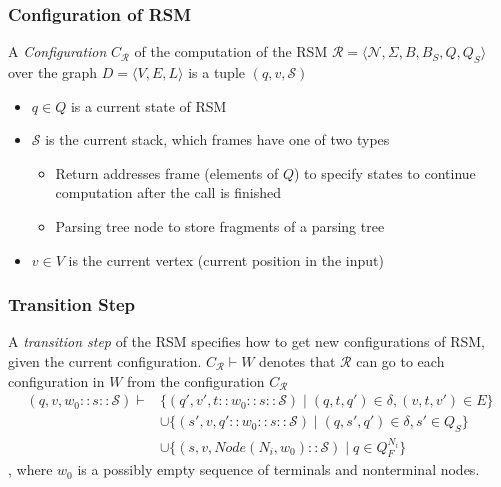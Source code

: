 \documentclass[xcolor=table,aspectratio=169]{beamer}
\begin{document}
\begin{frame}[fragile]
  \frametitle{Configuration of RSM}  
  \begin{definition}
    A \textit{Configuration} $C_{\mathcal{R}}$ of the computation of the RSM $\mathcal{R}=\langle \mathcal{N},\Sigma,B,B_S,Q,Q_S \rangle$ over the graph $D=\langle V,E,L \rangle$ is a tuple $(q,v,\mathcal{S})$
    \begin{itemize}
        \item $q \in Q$ is a current state of RSM
        \item $\mathcal{S}$ is the current stack, which frames have one of two types
        \begin{itemize} 
            \item Return addresses frame (elements of $Q$) to specify states to continue computation after the call is finished
            \item Parsing tree node to store fragments of a parsing tree
        \end{itemize}
        \item $v \in V$ is the current vertex (current position in the input)
    \end{itemize}
\end{definition}
\end{frame}

\begin{frame}[fragile]
  \frametitle{Transition Step}
  \begin{definition}\label{def:rsm_transition}
    A \textit{transition step} of the RSM specifies how to get new configurations of RSM, given the current configuration. $C_{\mathcal{R}} \vdash W$ denotes that $\mathcal{R}$ can go to each configuration in $W$ from the configuration $C_{\mathcal{R}}$
    \begin{align*}
    (q,v,w_0::s::\mathcal{S})  \vdash & \{ (q',v',t::w_0::s::\mathcal{S}) \mid (q,t,q') \in \delta, (v,t,v') \in E\} \\
                       & \cup \{(s', v, q'::w_0::s::\mathcal{S}) \mid (q,s',q') \in \delta, s' \in Q_S \} \\
                       & \cup \{(s,v,\textit{Node}(N_i, w_0)::\mathcal{S}) \mid q \in Q_F^{N_i}\}
    \end{align*}
    , where $w_0$ is a possibly empty sequence of terminals and nonterminal nodes. 
\end{definition}
\end{frame}
\end{document}
